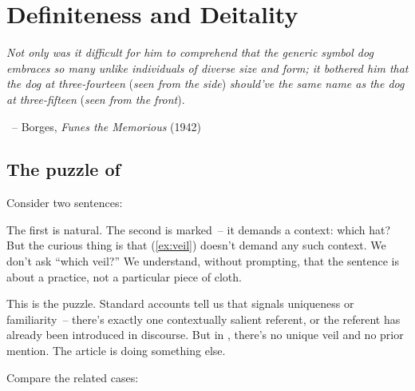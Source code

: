 \chapter{Definiteness and Deitality}
\label{ch:definiteness-and-deitality}


\epigraph{\textit{Not only was it difficult for him to comprehend that the generic symbol dog embraces so many unlike individuals of diverse size and form; it bothered him that the dog at three-fourteen} (\textit{seen from the side}) \textit{should've the same name as the dog at three-fifteen} (\textit{seen from the front}).}{~-- Borges, \textit{Funes the Memorious} (1942)}

\section{The puzzle of }
\label{sec:10:hook}

Consider two sentences:

\z
{}
\z

The first is natural. The second is marked~-- it demands a context: which hat? But the curious thing is that (\ref{ex:veil}) doesn't demand any such context. We don't ask \enquote{which veil?} We understand, without prompting, that the sentence is about a practice, not a particular piece of cloth.

This is the  puzzle. Standard accounts tell us that  signals uniqueness or familiarity~-- there's exactly one contextually salient referent, or the referent has already been introduced in discourse. But in , there's no unique veil and no prior mention. The article is doing something else.

Compare the related cases:

\z
{}
\z
{}
\z
{}
\z

